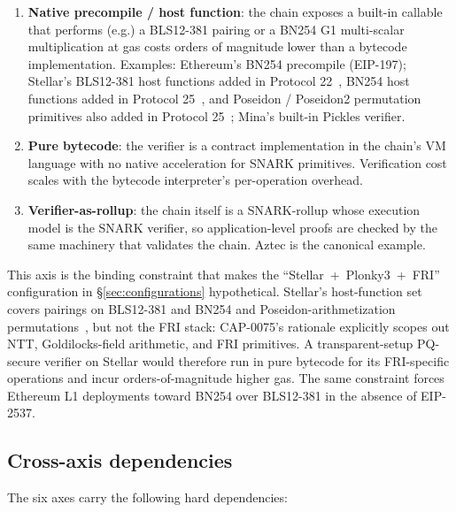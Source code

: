 \begin{enumerate}
  \item \textbf{Native precompile / host function}: the chain exposes
    a built-in callable that performs (e.g.) a BLS12-381 pairing or
    a BN254 G1 multi-scalar multiplication at gas costs orders of
    magnitude lower than a bytecode implementation. Examples:
    Ethereum's BN254 precompile (EIP-197); Stellar's BLS12-381 host
    functions added in Protocol 22~\cite{stellar-cap-0059}, BN254
    host functions added in Protocol 25~\cite{stellar-cap-0074},
    and Poseidon / Poseidon2 permutation primitives also added in
    Protocol 25~\cite{stellar-cap-0075}; Mina's built-in Pickles
    verifier.
  \item \textbf{Pure bytecode}: the verifier is a contract
    implementation in the chain's VM language with no native
    acceleration for SNARK primitives. Verification cost scales with
    the bytecode interpreter's per-operation overhead.
  \item \textbf{Verifier-as-rollup}: the chain itself is a SNARK-rollup
    whose execution model is the SNARK verifier, so application-level
    proofs are checked by the same machinery that validates the
    chain. Aztec is the canonical example.
\end{enumerate}

This axis is the binding constraint that makes the
``Stellar~+~Plonky3~+~FRI'' configuration in
\S\ref{sec:configurations} hypothetical. Stellar's
host-function set covers pairings on BLS12-381 and BN254 and
Poseidon-arithmetization permutations~\cite{stellar-cap-0075}, but
not the FRI stack: CAP-0075's rationale explicitly scopes out NTT,
Goldilocks-field arithmetic, and FRI primitives. A transparent-setup
PQ-secure verifier on Stellar would therefore run in pure bytecode
for its FRI-specific operations and incur orders-of-magnitude higher
gas. The same constraint forces Ethereum L1 deployments toward BN254
over BLS12-381 in the absence of EIP-2537.

\subsection{Cross-axis dependencies}
\label{sec:dimensions-deps}

The six axes carry the following hard dependencies:

